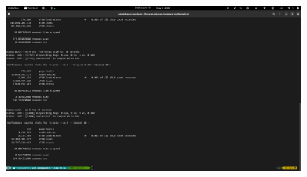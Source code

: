 \documentclass{article}
\begin{document}
\subsection{}
\begin{figure}[H]
   \centering
   \includegraphics[width=\linewidth]{3-1.png}
\end{figure}
\end{document}
